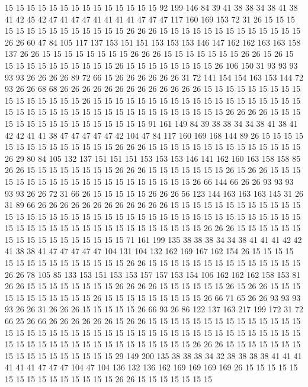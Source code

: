 15 15 15 15 15 15 15 15 15 15 15 15 15 15 92 199 146 84 39 41
38 38 34 38 41 38 41 42 45 42 47 41 47 47 41 41 41 41 47 47
47 117 160 169 153 72 31 26 15 15 15 15 15 15 15 15 15 15 15 15
15 15 26 26 26 15 15 15 15 15 15 15 15 15 15 15 15 15 26 26
60 47 84 105 117 137 153 151 151 153 153 153 146 147 162 162 163 163 158 137
26 26 15 15 15 15 15 15 15 15 26 26 26 15 15 15 15 15 15 15
26 26 15 26 15 15 15 15 15 15 15 15 15 15 15 26 15 15 15 15
15 15 15 15 26 106 150 31 93 93 93 93 93 26 26 26 26 89 72 66
15 26 26 26 26 26 26 31 72 141 154 154 163 153 144 72 93 26 26 68
68 26 26 26 26 26 26 26 26 26 26 26 26 26 15 15 15 15 15 15
15 15 15 15 15 15 15 15 15 15 26 15 15 15 15 15 15 15 15 15
15 15 15 15 15 15 15 15 15 15 15 15 15 15 15 15 15 15 15 15
15 15 15 15 15 15 15 15 15 15 26 26 26 26 15 15 15 15 15 15
15 15 15 15 15 15 15 15 15 15 91 161 149 84 39 38 38 34 34 38
41 38 41 42 42 41 41 38 47 47 47 47 47 42 104 47 84 117 160 169
168 144 89 26 15 15 15 15 15 15 15 15 15 15 15 15 15 15 26 26
26 15 15 15 15 15 15 15 15 15 15 15 15 15 15 26 29 80 84 105
132 137 151 151 151 153 153 153 146 141 162 160 163 158 158 85 26 26 15 15
15 15 15 15 15 15 26 26 26 15 15 15 15 15 15 15 26 15 26 26
15 15 15 15 15 15 15 15 15 15 15 15 15 15 15 15 15 15 15 15
26 66 144 66 26 26 93 93 93 93 93 26 26 72 31 66 26 15 15 15
15 15 26 26 26 56 123 144 163 163 163 145 31 26 31 89 66 26 26 26
26 26 26 26 26 26 26 26 26 15 15 15 15 15 15 15 15 15 15 15
15 15 15 15 15 15 15 15 15 15 15 15 15 15 15 15 15 15 15 15
15 15 15 15 15 15 15 15 15 15 15 15 15 15 15 15 15 15 15 15
15 15 15 15 15 15 26 26 26 15 15 15 15 15 15 15 15 15 15 15
15 15 15 15 15 15 71 161 199 135 38 38 38 34 34 38 41 41 41 42
42 41 38 38 41 47 47 47 47 47 104 131 104 132 162 169 167 162 154 26
15 15 15 15 15 15 15 15 15 15 15 15 15 15 15 26 26 15 15 15
15 15 15 15 15 15 15 15 15 15 15 26 26 78 105 85 133 153 151 153
153 157 157 153 154 106 162 162 162 158 153 81 26 26 15 15 15 15 15 15
15 15 26 26 26 26 15 15 15 15 15 15 26 15 26 26 15 15 15 15
15 15 15 15 15 15 15 26 15 15 15 15 15 15 15 15 15 26 66 71
65 26 26 93 93 93 93 26 26 31 26 26 26 15 15 15 15 15 26 66
93 26 86 122 137 163 217 199 172 31 72 66 25 26 66 26 26 26 26 26
26 15 26 26 15 15 15 15 15 15 15 15 15 15 15 15 15 15 15 15
15 15 15 15 15 15 15 15 15 15 15 15 15 15 15 15 15 15 15 15
15 15 15 15 15 15 15 15 15 15 15 15 15 15 15 15 15 15 15 15
15 15 26 26 26 15 15 15 15 15 15 15 15 15 15 15 15 15 15 15
15 15 29 149 200 135 38 38 38 34 32 38 38 38 38 41 41 41 41 41
41 47 47 47 104 47 104 136 132 136 162 169 169 169 169 26 15 15 15 15
15 15 15 15 15 15 15 15 15 15 15 26 26 15 15 15 15 15 15 15

